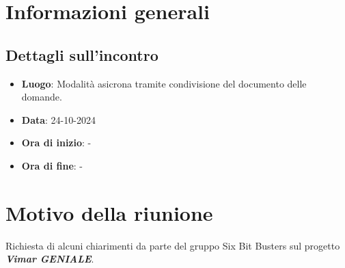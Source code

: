 \section{Informazioni generali}
\subsection{Dettagli sull'incontro}
\begin{itemize}
    \item \textbf{Luogo}: Modalità asicrona tramite condivisione del documento delle domande.
    \item \textbf{Data}: 24-10-2024
    \item \textbf{Ora di inizio}: -
    \item \textbf{Ora di fine}: -
\end{itemize}

\section{Motivo della riunione}
Richiesta di alcuni chiarimenti da parte del gruppo Six Bit Busters sul progetto \textbf{\textit{Vimar GENIALE}}.

